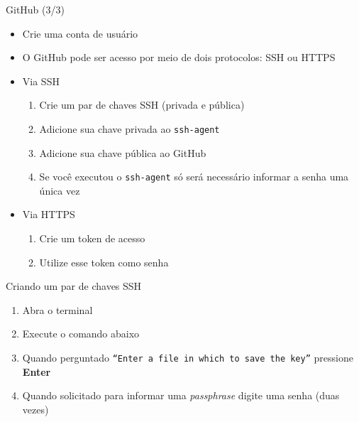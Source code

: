 \documentclass[aspectratio=169,14pt]{beamer}
\begin{document}
\begin{frame}[fragile]{GitHub (3/3)}
    \begin{itemize}
        \item Crie uma conta de usuário
        \item O GitHub pode ser acesso por meio de dois protocolos: SSH ou HTTPS
        \item Via SSH
        \begin{enumerate}
            \item Crie um par de chaves SSH (privada e pública)
            \item Adicione sua chave privada ao \texttt{ssh-agent}
            \item Adicione sua chave pública ao GitHub
            \item Se você executou o \texttt{ssh-agent} só será necessário
            informar a senha uma única vez
        \end{enumerate}
        \item Via HTTPS
        \begin{enumerate}
            \item Crie um token de acesso
            \item Utilize esse token como senha
        \end{enumerate}
    \end{itemize}
\end{frame}

\begin{frame}[fragile]{Criando um par de chaves SSH}
    \begin{enumerate}
        \item Abra o terminal
        \item Execute o comando abaixo
        \item Quando perguntado \texttt{``Enter a file in which to save the
        key''} pressione \textbf{Enter}
        \item Quando solicitado para informar uma \textit{passphrase} digite
        uma senha (duas vezes)
    \end{enumerate}
\end{frame}
\end{document}
